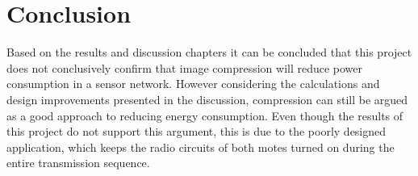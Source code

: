 \chapter{Conclusion}

Based on the results and discussion chapters it can be concluded that this project does not conclusively confirm that image compression will reduce power consumption in a sensor network. However considering the calculations and design improvements presented in the discussion, compression can still be argued as a good approach to reducing energy consumption. Even though the results of this project do not support this argument, this is due to the poorly designed application, which keeps the radio circuits of both motes turned on during the entire transmission sequence. 